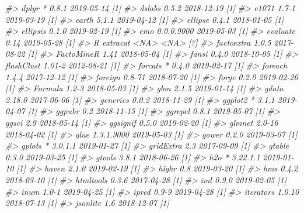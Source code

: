 \documentclass[]{krantz}
\makeatletter
\newenvironment{Shaded}{\begin{snugshade}}{\end{snugshade}}
\newcommand{\CommentTok}[1]{\textcolor[rgb]{0.37,0.37,0.37}{\textit{#1}}}
\newenvironment{kframe}{%
\medskip{}
\setlength{\fboxsep}{.8em}
 \def\at@end@of@kframe{}%
 \ifinner\ifhmode%
  \def\at@end@of@kframe{\end{minipage}}%
  \begin{minipage}{\columnwidth}%
 \fi\fi%
 \def\FrameCommand##1{\hskip\@totalleftmargin \hskip-\fboxsep
 \colorbox{shadecolor}{##1}\hskip-\fboxsep
     \hskip-\linewidth \hskip-\@totalleftmargin \hskip\columnwidth}%
 \MakeFramed {\advance\hsize-\width
   \@totalleftmargin\z@ \linewidth\hsize
   \@setminipage}}%
 {\par\unskip\endMakeFramed%
 \at@end@of@kframe}
\renewenvironment{Shaded}{\begin{kframe}}{\end{kframe}}
\makeatother
\begin{document}
\begin{Shaded}
\begin{Highlighting}[]
\CommentTok{#>    dplyr         * 0.8.1      2019-05-14 [1]}
\CommentTok{#>    dslabs          0.5.2      2018-12-19 [1]}
\CommentTok{#>    e1071           1.7-1      2019-03-19 [1]}
\CommentTok{#>    earth           5.1.1      2019-04-12 [1]}
\CommentTok{#>    ellipse         0.4.1      2018-01-05 [1]}
\CommentTok{#>    ellipsis        0.1.0      2019-02-19 [1]}
\CommentTok{#>    emo             0.0.0.9000 2019-05-03 [1]}
\CommentTok{#>    evaluate        0.14       2019-05-28 [1]}
\CommentTok{#>  R extracat        <NA>       <NA>       [?]}
\CommentTok{#>    factoextra      1.0.5      2017-08-22 [1]}
\CommentTok{#>    FactoMineR      1.41       2018-05-04 [1]}
\CommentTok{#>    fansi           0.4.0      2018-10-05 [1]}
\CommentTok{#>    flashClust      1.01-2     2012-08-21 [1]}
\CommentTok{#>    forcats       * 0.4.0      2019-02-17 [1]}
\CommentTok{#>    foreach         1.4.4      2017-12-12 [1]}
\CommentTok{#>    foreign         0.8-71     2018-07-20 [1]}
\CommentTok{#>    forge           0.2.0      2019-02-26 [1]}
\CommentTok{#>    Formula         1.2-3      2018-05-03 [1]}
\CommentTok{#>    gbm             2.1.5      2019-01-14 [1]}
\CommentTok{#>    gdata           2.18.0     2017-06-06 [1]}
\CommentTok{#>    generics        0.0.2      2018-11-29 [1]}
\CommentTok{#>    ggplot2       * 3.1.1      2019-04-07 [1]}
\CommentTok{#>    ggpubr          0.2        2018-11-15 [1]}
\CommentTok{#>    ggrepel         0.8.1      2019-05-07 [1]}
\CommentTok{#>    ggsci           2.9        2018-05-14 [1]}
\CommentTok{#>    ggsignif        0.5.0      2019-02-20 [1]}
\CommentTok{#>    glmnet          2.0-16     2018-04-02 [1]}
\CommentTok{#>    glue            1.3.1.9000 2019-05-03 [1]}
\CommentTok{#>    gower           0.2.0      2019-03-07 [1]}
\CommentTok{#>    gplots        * 3.0.1.1    2019-01-27 [1]}
\CommentTok{#>    gridExtra       2.3        2017-09-09 [1]}
\CommentTok{#>    gtable          0.3.0      2019-03-25 [1]}
\CommentTok{#>    gtools          3.8.1      2018-06-26 [1]}
\CommentTok{#>    h2o           * 3.22.1.1   2019-01-10 [1]}
\CommentTok{#>    haven           2.1.0      2019-02-19 [1]}
\CommentTok{#>    highr           0.8        2019-03-20 [1]}
\CommentTok{#>    hms             0.4.2      2018-03-10 [1]}
\CommentTok{#>    htmltools       0.3.6      2017-04-28 [1]}
\CommentTok{#>    iml             0.9.0      2019-02-05 [1]}
\CommentTok{#>    inum            1.0-1      2019-04-25 [1]}
\CommentTok{#>    ipred           0.9-9      2019-04-28 [1]}
\CommentTok{#>    iterators       1.0.10     2018-07-13 [1]}
\CommentTok{#>    jsonlite        1.6        2018-12-07 [1]}

\end{Highlighting}
\end{Shaded}
\end{document}

